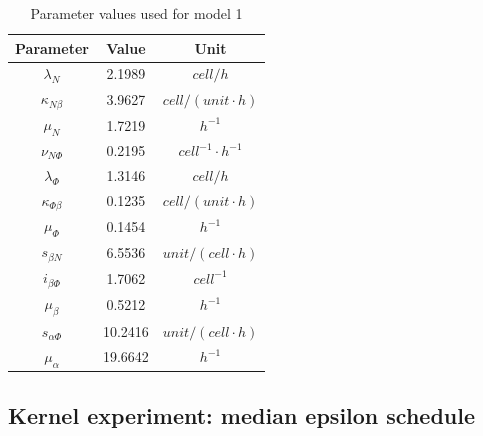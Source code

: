 \documentclass[12pt,a4paper]{report}
\begin{document}
\begin{table}[h!]
    \centering
    \begin{tabular}{|c c c|} 
     \hline
     Parameter & Value & Unit\\ [0.5ex] 
     \hline\hline
     $\lambda_N$ & 2.1989 & $cell/h$  \\ 
     $\kappa_{N\beta}$ & 3.9627 & $cell/(unit\cdotp h)$\\
     $\mu_N$ & 1.7219 & $h^{-1}$\\
     $\nu_{N\Phi}$ & 0.2195 & $cell^{-1}\cdotp h^{-1}$ \\
     \hline
     $\lambda_\Phi$ & 1.3146 & $cell/h$ \\
     $\kappa_{\Phi\beta}$ & 0.1235 & $cell/(unit\cdotp h)$ \\
     $\mu_\Phi$ & 0.1454 & $h^{-1}$ \\
     \hline
     $s_{\beta N}$ & 6.5536 & $unit/(cell\cdotp h)$ \\
     $i_{\beta\Phi}$ & 1.7062 & $cell^{-1}$ \\
     $\mu_\beta$ & 0.5212 & $h^{-1}$ \\
     \hline
     $s_{\alpha\Phi}$ & 10.2416 & $unit/(cell\cdotp h)$ \\
     $\mu_\alpha$ & 19.6642 & $h^{-1}$ \\
    [1ex] 
     \hline
    \end{tabular}
    \caption{Parameter values used for model 1}
    \label{table:m1}
\end{table}

\subsection{Kernel experiment: median epsilon schedule}
\end{document}

